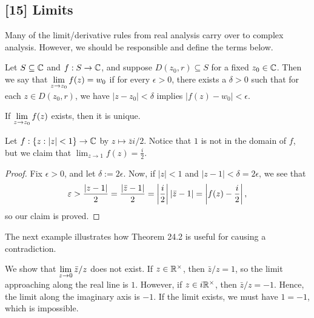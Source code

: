 \documentclass{article}
\begin{document}
\subsection*{[15] Limits}
Many of the limit/derivative rules from real analysis carry over to complex analysis. However, we should be responsible and define the terms below.
\begin{definition}
Let $S\subseteq\mathbb C$ and $f: S\to \mathbb C$, and suppose $D(z_0, r)\subseteq S$ for a fixed $z_0\in \mathbb C$. Then we say that $\displaystyle\lim_{z\to z_0}f(z) = w_0$ if for every $\epsilon>0$, there exists a $\delta > 0$ such that for each $z\in D(z_0, r)$, we have $|z-z_0|<\delta$ implies $|f(z)-w_0| < \epsilon$.
\end{definition}
\begin{theorem}
If $\displaystyle\lim_{z\to z_0} f(z)$ exists, then it is unique.
\end{theorem}
\begin{example}
Let $f: \{z: |z|<1\}\to\mathbb C$ by $z\mapsto \bar zi/2$. Notice that $1$ is not in the domain of $f$, but we claim that $\boxed{\lim_{z\to 1} f(z) = \frac i2}$.
\end{example}
\begin{proof}
Fix $\epsilon> 0$, and let $\delta := 2\epsilon$. Now, if $|z|<1$ and $|z-1|<\delta = 2\epsilon$, we see that
$$\varepsilon > \frac{|z-1|}2 = \frac{|\bar z-1|}2 = \left|\frac i2\right||\bar z - 1| = \left|f(z) - \frac i2\right|,$$
so our claim is proved.
\end{proof}

The next example illustrates how Theorem 24.2 is useful for causing a contradiction.
\begin{example}
We show that $\displaystyle\lim_{z\to 0} \bar z/z$ does not exist. If $z\in\mathbb R^\times$, then $\bar z/z = 1$, so the limit approaching along the real line is $1$. However, if $z\in i\mathbb R^\times$, then $\bar z/z = -1$. Hence, the limit along the imaginary axis is $-1$. If the limit exists, we must have $1 = -1$, which is impossible.
\end{example}
\end{document}
